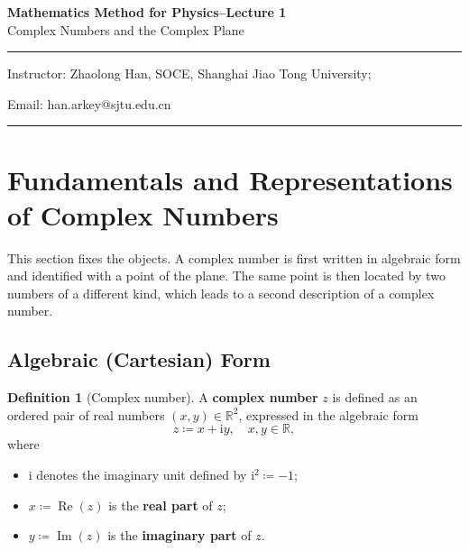 \documentclass[11pt,a4paper]{article}
\theoremstyle{definition}
\newtheorem{definition}{Definition}
\theoremstyle{plain}
\begin{document}
\begin{center}
    {\LARGE \textbf{Mathematics Method for Physics--Lecture 1}} \\[0.6em]
    {\large Complex Numbers and the Complex Plane}
\end{center}

\vspace{-0.5em}
\noindent\rule{\textwidth}{0.5pt}
\vspace{0.3em}

\begin{center}
    Instructor: Zhaolong Han, SOCE, Shanghai Jiao Tong University;
\end{center}

\vspace{-0.6em}
\noindent Email: han.arkey@sjtu.edu.cn

\vspace{0.4em}
\noindent\rule{\textwidth}{0.5pt}

\vspace{0.8em}

\vspace{1.5em}

\section{Fundamentals and Representations of Complex Numbers}

This section fixes the objects. A complex number is first written in algebraic form and identified with a point of the plane. The same point is then located by two numbers of a different kind, which leads to a second description of a complex number.

\subsection{Algebraic (Cartesian) Form}



\begin{definition}[Complex number]
A \textbf{complex number} $z$ is defined as an ordered pair of real numbers $(x, y) \in \mathbb{R}^2$, expressed in the algebraic form
\begin{equation}
z \coloneqq x + \mathrm{i} y, \quad x, y \in \mathbb{R},
\end{equation}
where
\begin{itemize}
    \item $\mathrm{i}$ denotes the imaginary unit defined by $\mathrm{i}^2 \coloneqq -1$;
    \item $x \coloneqq \operatorname{Re}(z)$ is the \textbf{real part} of $z$;
    \item $y \coloneqq \operatorname{Im}(z)$ is the \textbf{imaginary part} of $z$.
\end{itemize}
\end{definition}
\end{document}
